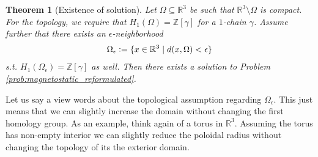 \documentclass[12pt,a4paper]{article}
\numberwithin{equation}{subsection}
\numberwithin{lemma}{subsection}
\newtheorem{theorem}[lemma]{Theorem}
\theoremstyle{definition}
\newcommand{\integers}{\mathbb{Z}}
\newcommand{\real}{\mathbb{R}}
\begin{document}
\begin{theorem}[Existence of solution]\label{thm:existence}
    Let $\Omega \subseteq \real^3$ be such that $\real^3 \setminus \Omega$
    is compact. 
    For the topology, we require that $H_1(\Omega) = \integers [\gamma]$ 
    for a $1$-chain 
    $\gamma$. Assume further that there exists an $\epsilon$-neighborhood 
    \begin{align*}
        \Omega_\epsilon \vcentcolon= \{ x \in \real^3 \mid
            d(x,\Omega) < \epsilon \} 
    \end{align*}
    s.t. $H_1(\Omega_\epsilon) = \integers [\gamma]$ as well.
    Then there exists a solution 
    to Problem \ref{prob:magnetostatic_reformulated}.
\end{theorem}
Let us say a view words about the topological assumption 
regarding $\Omega_\epsilon$. This just means that we can slightly increase 
the domain without changing the first homology group. As an example, 
think again of a torus in $\real^3$. Assuming the torus has non-empty interior 
we can slightly reduce the poloidal radius without changing the topology of its 
the exterior domain.
\end{document}
